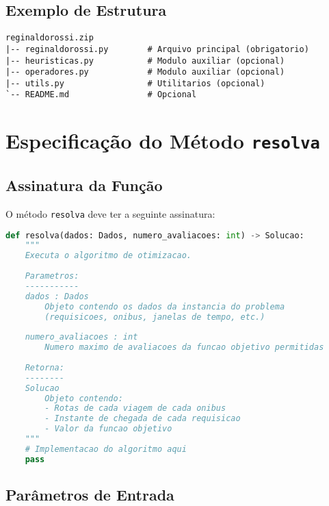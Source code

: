 \documentclass[12pt,a4paper]{article}
\begin{document}
\subsection{Exemplo de Estrutura}

\begin{tcolorbox}[colback=blue!5!white,colframe=blue!75!black,title=Estrutura de Diretórios]
\begin{verbatim}
reginaldorossi.zip
|-- reginaldorossi.py        # Arquivo principal (obrigatorio)
|-- heuristicas.py           # Modulo auxiliar (opcional)
|-- operadores.py            # Modulo auxiliar (opcional)
|-- utils.py                 # Utilitarios (opcional)
`-- README.md                # Opcional
\end{verbatim}
\end{tcolorbox}

\section{Especificação do Método \texttt{resolva}}

\subsection{Assinatura da Função}

O método \texttt{resolva} deve ter a seguinte assinatura:

\begin{lstlisting}[language=Python]
def resolva(dados: Dados, numero_avaliacoes: int) -> Solucao:
    """
    Executa o algoritmo de otimizacao.
    
    Parametros:
    -----------
    dados : Dados
        Objeto contendo os dados da instancia do problema
        (requisicoes, onibus, janelas de tempo, etc.)
    
    numero_avaliacoes : int
        Numero maximo de avaliacoes da funcao objetivo permitidas
    
    Retorna:
    --------
    Solucao
        Objeto contendo:
        - Rotas de cada viagem de cada onibus
        - Instante de chegada de cada requisicao
        - Valor da funcao objetivo
    """
    # Implementacao do algoritmo aqui
    pass
\end{lstlisting}

\subsection{Parâmetros de Entrada}
\end{document}
